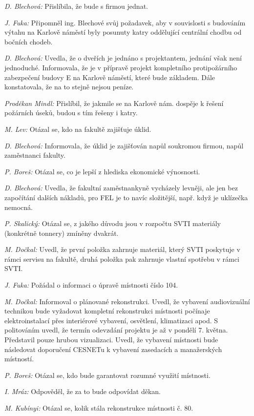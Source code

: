 \documentclass[a4paper,12pt,notitlepage,oneside]{article}
\begin{document}
\textit{D. Blechová:} Přislíbila, že bude s firmou jednat.

\textit{J. Fuka:} Připomněl ing. Blechové svůj požadavek, aby v souvislosti s budováním výtahu na Karlově náměstí byly posunuty katry oddělující centrální chodbu od bočních chodeb.

\textit{D. Blechová:} Uvedla, že o dveřích je jednáno s projektantem, jednání však není jednoduché. Informovala, že je v přípravě projekt kompletního protipožárního zabezpečení budovy E na Karlově náměstí, které bude základem. Dále konstatovala, že na to stejně nejsou peníze.

\textit{Proděkan Mindl:} Přislíbil, že jakmile se na Karlově nám. dospěje k řešení požárních úseků, budou s tím řešeny i katry.

\textit{M. Lev:} Otázal se, kdo na fakultě zajišťuje úklid.

\textit{D. Blechová:} Informovala, že úklid je zajišťován napůl soukromou firmou, napůl zaměstnanci fakulty.

\textit{P. Boreš:} Otázal se, co je lepší z hlediska ekonomické výnosnosti.

\textit{D. Blechová:} Uvedla, že fakultní zaměstnankyně vycházely levněji, ale jen bez započítání dalších nákladů, pro FEL je to navíc složitější, např. když je uklízečka nemocná.

\textit{P. Skalický:} Otázal se, z jakého důvodu jsou v rozpočtu SVTI materiály (konkrétně tonnery) zmíněny dvakrát.

\textit{M. Dočkal:} Uvedl, že první položka zahrnuje materiál, který SVTI poskytuje v rámci servisu na fakultě, druhá položka pak zahrnuje vlastní spotřebu v rámci SVTI.

\textit{J. Fuka:} Požádal o informaci o úpravě místnosti číslo 104.

\textit{M. Dočkal:} Informoval o plánované rekonstrukci. Uvedl, že vybavení audiovizuální technikou bude vyžadovat kompletní rekonstrukci místnosti počínaje elektroinstalací přes interiérové vybavení, osvětlení, klimatizaci apod. S politováním uvedl, že termín odevzdání projektu je až v pondělí 7. května. Představil pouze hrubou vizualizaci. Uvedl, že vybavení místnosti bude následovat doporučení CESNETu k vybavení zasedacích a manažerských místností.

\textit{P. Boreš:} Otázal se, kdo bude garantovat rozumné využití místnosti.

\textit{I. Mráz:} Odpověděl, že za to bude odpovídat děkan.

\textit{M. Kubínyi:} Otázal se, kolik stála rekonstrukce místnosti č. 80.
\end{document}
